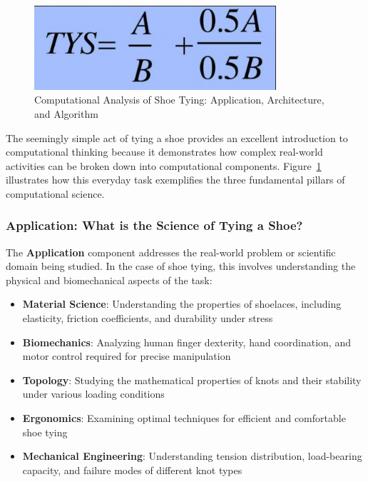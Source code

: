\begin{figure}[h]
 \centering
 \includegraphics[width=0.8\textwidth]{images/shoe_tying_example.png}
 \caption{Computational Analysis of Shoe Tying: Application, Architecture, and Algorithm}
 \label{fig:shoe_tying_example}
\end{figure}

The seemingly simple act of tying a shoe provides an excellent introduction to computational thinking because it demonstrates how complex real-world activities can be broken down into computational components. Figure~\ref{fig:shoe_tying_example} illustrates how this everyday task exemplifies the three fundamental pillars of computational science.

\subsubsection{Application: What is the Science of Tying a Shoe?}

The \textbf{Application} component addresses the real-world problem or scientific domain being studied. In the case of shoe tying, this involves understanding the physical and biomechanical aspects of the task:

\begin{itemize}
    \item \textbf{Material Science}: Understanding the properties of shoelaces, including elasticity, friction coefficients, and durability under stress
    \item \textbf{Biomechanics}: Analyzing human finger dexterity, hand coordination, and motor control required for precise manipulation
    \item \textbf{Topology}: Studying the mathematical properties of knots and their stability under various loading conditions
    \item \textbf{Ergonomics}: Examining optimal techniques for efficient and comfortable shoe tying
    \item \textbf{Mechanical Engineering}: Understanding tension distribution, load-bearing capacity, and failure modes of different knot types
\end{itemize}

